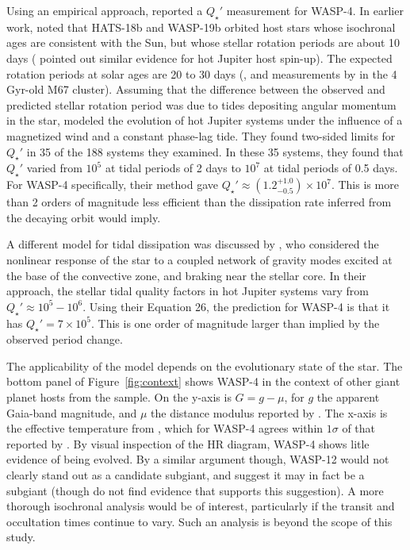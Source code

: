 \documentclass[12pt,twocolumn,tighten]{aastex62}
\begin{document}
Using an empirical approach, \citet{penev_empirical_2018} reported a
$Q_\star'$ measurement for WASP-4.  In earlier work,
\citet{penev_hats-18b_2016} noted that HATS-18b and WASP-19b orbited
host stars whose isochronal ages are consistent with the Sun, but
whose stellar rotation periods are about 10 days
(\citealt{pont_empirical_2009} pointed out similar evidence for hot
Jupiter host spin-up).  The expected rotation periods at solar ages
are 20 to 30 days
(\citealt{schatzman_theory_1962,skumanich_time_1972}, and measurements
by \citealt{barnes_rotation_2016} in the 4\,Gyr-old M67 cluster).
Assuming that the difference between the observed and predicted
stellar rotation period was due to tides depositing angular momentum
in the star, \citet{penev_empirical_2018} modeled the evolution of hot
Jupiter systems under the influence of a magnetized wind and a
constant phase-lag tide.  They found two-sided limits for $Q_\star'$
in 35 of the 188 systems they examined.  In these 35 systems, they
found that $Q_\star'$ varied from $10^5$ at tidal periods of 2 days to
$10^7$ at tidal periods of 0.5 days.  For WASP-4 specifically, their
method gave $Q_\star' \approx (1.2^{+1.0}_{-0.5})\times10^7$. This is
more than 2 orders of magnitude less efficient than the dissipation
rate inferred from the decaying orbit would imply.

A different model for tidal dissipation was discussed by
\citet{essick_orbital_2016}, who considered the nonlinear response of
the star to a coupled network of gravity modes excited at the base of
the convective zone, and braking near the stellar core.  In their
approach, the stellar tidal quality factors in hot Jupiter systems
vary from $Q_\star' \approx 10^5 - 10^6$.  Using their Equation 26,
the prediction for WASP-4 is that it has $Q_\star' = 7\times10^5$.
This is one order of magnitude larger than implied by the
observed period change.

The applicability of the \citet{essick_orbital_2016} model depends on
the evolutionary state of the star.  The bottom panel of
Figure~\ref{fig:context} shows WASP-4 in the context of other giant
planet hosts from the \citet{bonomo_gaps_2017} sample.  On the y-axis
is $G=g-\mu$, for $g$ the apparent Gaia-band magnitude, and $\mu$ the
distance modulus reported by \citet{gaia_collaboration_gaia_2018}.
The x-axis is the effective temperature from \citet{bonomo_gaps_2017},
which for WASP-4 agrees within $1\sigma$ of that reported by
\citet{petrucci_no_2013}.  By visual inspection of the HR diagram,
WASP-4 shows litle evidence of being evolved.  By a similar argument
though, WASP-12 would not clearly stand out as a candidate subgiant,
and \citet{weinberg_tidal_2017} suggest it may in fact be a subgiant
(though \citealt{bailey_understanding_2019} do not find evidence that
supports this suggestion).  A more thorough isochronal analysis would
be of interest, particularly if the transit and occultation times
continue to vary.  Such an analysis is beyond the scope of this study.
\end{document}

